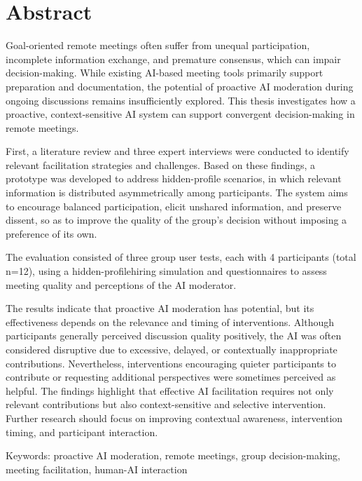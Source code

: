 \chapter*{Abstract}

Goal-oriented remote meetings often suffer from unequal participation, incomplete information exchange, and
premature consensus, which can impair decision-making. While existing AI-based meeting tools primarily
support preparation and documentation, the potential of proactive AI moderation during ongoing discussions
remains insufficiently explored. This thesis investigates how a proactive, context-sensitive AI system can
support convergent decision-making in remote meetings.

First, a literature review and three expert interviews were conducted to identify relevant facilitation
strategies and challenges. Based on these findings, a prototype was developed to address hidden-profile
scenarios, in which relevant information is distributed asymmetrically among participants. The system aims to
encourage balanced participation, elicit unshared information, and preserve dissent, so as to improve the
quality of the group's decision without imposing a preference of its own.

The evaluation consisted of three group user tests, each with 4 participants (total n=12), using a hidden-profilehiring
simulation and questionnaires to assess meeting quality and perceptions of the AI moderator.

The results indicate that proactive AI moderation has potential, but its effectiveness depends on the
relevance and timing of interventions. Although participants generally perceived discussion quality
positively, the AI was often considered disruptive due to excessive, delayed, or contextually inappropriate
contributions. Nevertheless, interventions encouraging quieter participants to contribute or requesting
additional perspectives were sometimes perceived as helpful. The findings highlight that effective AI
facilitation requires not only relevant contributions but also context-sensitive and selective intervention.
Further research should focus on improving contextual awareness, intervention timing, and participant interaction.

Keywords: proactive AI moderation, remote meetings, group decision-making, meeting facilitation, human-AI interaction